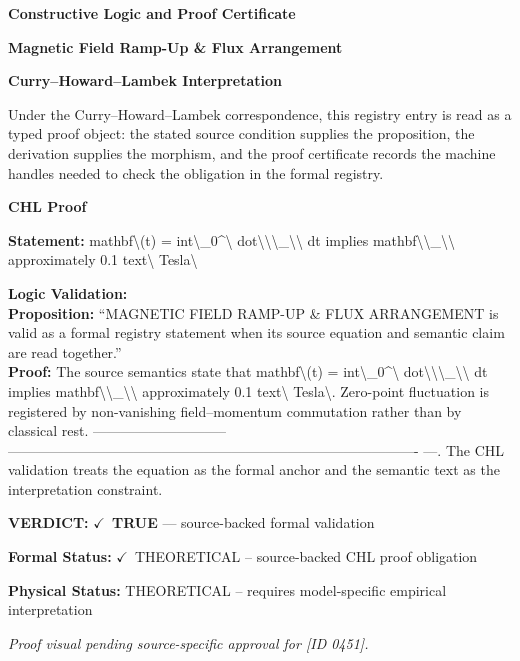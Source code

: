 \clearpage
\begingroup\tzpsupportsetup
\noindent\textbf{\fontsize{10.8pt}{12.8pt}\selectfont [ID 0451] Constructive Logic and Proof Certificate}\par
\noindent\textbf{\fontsize{10pt}{12pt}\selectfont Magnetic Field Ramp-Up \& Flux Arrangement}\par
\vspace{0.45em}
\begingroup
\footnotesize
\setlength{\parskip}{0.22em}
\setlength{\parindent}{0pt}
\noindent\textbf{Curry--Howard--Lambek Interpretation}\par
Under the Curry--Howard--Lambek correspondence, this registry entry is read as a typed proof
object: the stated source condition supplies the proposition, the derivation supplies the
morphism, and the proof certificate records the machine handles needed to check the obligation
in the formal registry.

\vspace{0.45em}
\noindent\textbf{CHL Proof}\par
\textbf{Statement:} mathbf\textbackslash{}(t) = int\textbackslash{}\_0\textasciicircum{}\textbackslash{} dot\textbackslash{}\textbackslash{}\textbackslash{}\_\textbackslash{}\textbackslash{} dt implies mathbf\textbackslash{}\textbackslash{}\_\textbackslash{}\textbackslash{} approximately 0.1 text\textbackslash{} Tesla\textbackslash{}

\textbf{Logic Validation:}\\
\textbf{Proposition:} ``MAGNETIC FIELD RAMP-UP \& FLUX ARRANGEMENT is valid as a formal registry statement when
its source equation and semantic claim are read together.''\\
\textbf{Proof:} The source semantics state that mathbf\textbackslash{}(t) = int\textbackslash{}\_0\textasciicircum{}\textbackslash{} dot\textbackslash{}\textbackslash{}\textbackslash{}\_\textbackslash{}\textbackslash{} dt implies mathbf\textbackslash{}\textbackslash{}\_\textbackslash{}\textbackslash{}
approximately 0.1 text\textbackslash{} Tesla\textbackslash{}. Zero-point fluctuation is registered by non-vanishing
field--momentum commutation rather than by classical rest. -----------------------------
----------------------------------------------------------------------------------------
---. The CHL validation treats the equation as the formal anchor and the semantic text
as the interpretation constraint.

\textbf{VERDICT:} \ensuremath{\checkmark}\ \textbf{TRUE} --- source-backed formal validation

\textbf{Formal Status:} \ensuremath{\checkmark}\ THEORETICAL -- source-backed CHL proof obligation

\textbf{Physical Status:} THEORETICAL -- requires model-specific empirical interpretation
\par\vspace{0.45em}
\par
\vfill
\begingroup\footnotesize\itshape
Proof visual pending source-specific approval for [ID 0451].
\par\endgroup
\vfill
\endgroup
\endgroup

